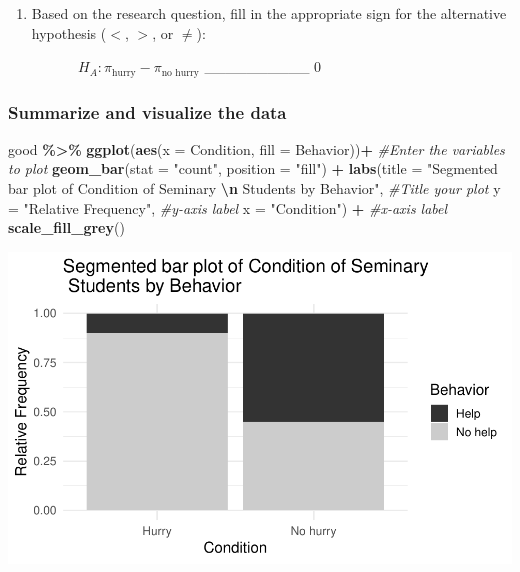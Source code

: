 \documentclass[
]{report}
\newenvironment{Shaded}{\begin{snugshade}}{\end{snugshade}}
\newcommand{\AttributeTok}[1]{\textcolor[rgb]{0.13,0.29,0.53}{#1}}
\newcommand{\CommentTok}[1]{\textcolor[rgb]{0.56,0.35,0.01}{\textit{#1}}}
\newcommand{\FunctionTok}[1]{\textcolor[rgb]{0.13,0.29,0.53}{\textbf{#1}}}
\newcommand{\NormalTok}[1]{#1}
\newcommand{\SpecialCharTok}[1]{\textcolor[rgb]{0.81,0.36,0.00}{\textbf{#1}}}
\newcommand{\StringTok}[1]{\textcolor[rgb]{0.31,0.60,0.02}{#1}}
\providecommand{\tightlist}{%
  \setlength{\itemsep}{0pt}\setlength{\parskip}{0pt}}
\begin{document}
\vspace{0.6in}

\begin{enumerate}
\def\labelenumi{\arabic{enumi}.}
\setcounter{enumi}{6}
\tightlist
\item
  Based on the research question, fill in the appropriate sign for the alternative hypothesis (\(<\), \(>\), or \(\neq\)):
  \vspace{2mm}
\end{enumerate}

~~~~~~~~~~\(H_A: \pi_{\text{hurry}} -\pi_{\text{no hurry}}\) \_\_\_\_\_\_\_\_\_\_ 0

\hypertarget{summarize-and-visualize-the-data-1}{%
\subsubsection*{Summarize and visualize the data}\label{summarize-and-visualize-the-data-1}}

\begin{Shaded}
\begin{Highlighting}[]
\NormalTok{good }\SpecialCharTok{\%\textgreater{}\%}
  \FunctionTok{ggplot}\NormalTok{(}\FunctionTok{aes}\NormalTok{(}\AttributeTok{x =}\NormalTok{ Condition, }\AttributeTok{fill =}\NormalTok{ Behavior))}\SpecialCharTok{+} \CommentTok{\#Enter the variables to plot}
  \FunctionTok{geom\_bar}\NormalTok{(}\AttributeTok{stat =} \StringTok{"count"}\NormalTok{, }\AttributeTok{position =} \StringTok{"fill"}\NormalTok{) }\SpecialCharTok{+}
  \FunctionTok{labs}\NormalTok{(}\AttributeTok{title =} \StringTok{"Segmented bar plot of Condition of Seminary }\SpecialCharTok{\textbackslash{}n}\StringTok{ Students by Behavior"}\NormalTok{, }\CommentTok{\#Title your plot}
       \AttributeTok{y =} \StringTok{"Relative Frequency"}\NormalTok{, }\CommentTok{\#y{-}axis label}
       \AttributeTok{x =} \StringTok{"Condition"}\NormalTok{) }\SpecialCharTok{+} \CommentTok{\#x{-}axis label}
  \FunctionTok{scale\_fill\_grey}\NormalTok{()}
\end{Highlighting}
\end{Shaded}

\begin{center}\includegraphics[width=0.8\linewidth]{08-OCA06-inference-2cat-simulation_files/figure-latex/unnamed-chunk-2-1} \end{center}
\end{document}
